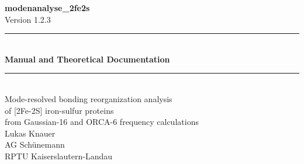 \documentclass[11pt,a4paper,twoside]{article}
\theoremstyle{remark}
\begin{document}
\begin{titlepage}
  \begin{center}
    \vspace*{2cm}
    {\Huge\bfseries\color{accent} modenanalyse\_2fe2s}\\[0.4cm]
    {\large Version 1.2.3}\\[2cm]

    \rule{\textwidth}{0.4pt}\\[0.3cm]
    {\LARGE\bfseries Manual and Theoretical Documentation}\\[0.3cm]
    \rule{\textwidth}{0.4pt}\\[1cm]

    {\large
      Mode-resolved bonding reorganization analysis\\
      of {[}2Fe-2S{]} iron-sulfur proteins\\
      from Gaussian-16 and ORCA-6 frequency calculations
    }\\[1.5cm]

    {\large
      Lukas Knauer\\
      AG Sch\"unemann\\
      RPTU Kaiserslautern-Landau
    }\\[1.5cm]


\end{center}
\end{titlepage}
\end{document}
